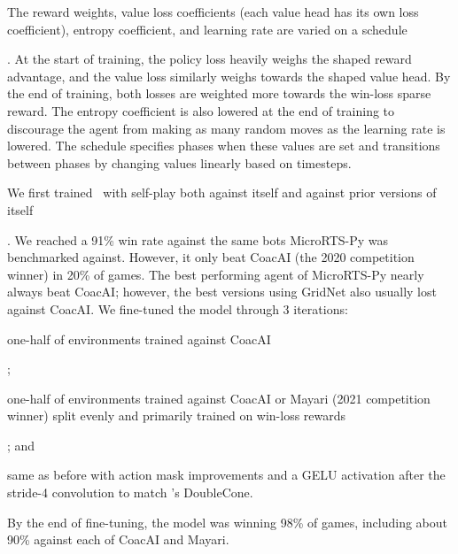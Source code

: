 \documentclass[conference]{IEEEtran}
\newif\ifsupplemental
\newcommand{\supptableref}[1]{%
  \ifsupplemental
    \ (Supplemental Table~\ref{#1})%
  \fi
}
\newcounter{supptable}
\begin{document}
The reward weights, value loss coefficients (each value
head has its own loss coefficient), entropy coefficient, and learning rate are varied on
a schedule\supptableref{tab:initial-training-schedule}. At the start of training, the policy loss heavily weighs the shaped 
reward advantage, and the value loss similarly weighs towards the shaped value head. By the end
of training, both losses are weighted more towards the win-loss sparse reward. The entropy coefficient is also
lowered at the end of training to discourage the agent from making as many random moves as the
learning rate is lowered. The schedule specifies phases when these values are set and
transitions between phases by changing values linearly based on timesteps.

We first trained \agentName\ with self-play both against itself and against prior
versions of itself\supptableref{tab:training-parameters}. We reached a 91\% win rate against the same bots MicroRTS-Py was
benchmarked against. However, it only beat CoacAI (the 2020 competition winner) in 20\%
of games. The best performing agent of MicroRTS-Py nearly always beat CoacAI; however,
the best versions using GridNet also usually lost against CoacAI. We fine-tuned
the model through 3 iterations:
\begin{inparaenum}[(1)]
    \item one-half of environments trained against CoacAI\supptableref{tab:shaped-finetuning-schedule};
    \item one-half of environments trained against CoacAI or Mayari (2021 competition
    winner) split evenly and primarily trained on win-loss rewards\supptableref{tab:sparse-finetuning-schedule}; and
    \item same as before with action mask improvements and a GELU activation
    after the stride-4 convolution to match \cite{Ferdinand2021doublecone}'s DoubleCone.
\end{inparaenum}
By the end of fine-tuning, the model was winning 98\% of games, including about 90\%
against each of CoacAI and Mayari.
\end{document}
